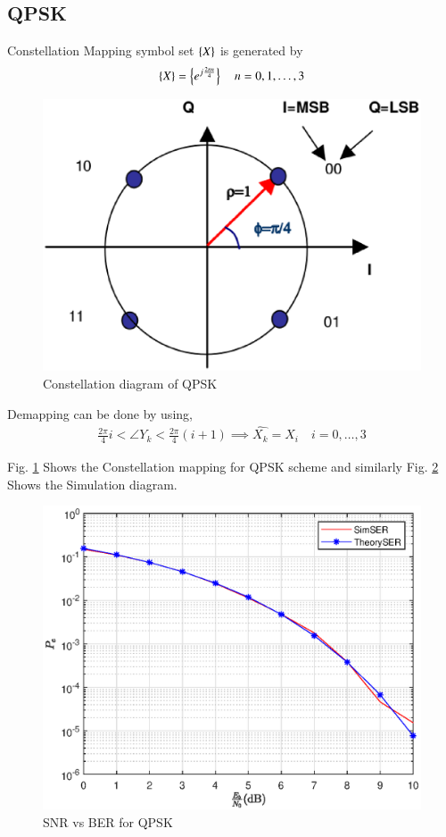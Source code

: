 \documentclass[journal,12pt,twocolumn]{IEEEtran}
\begin{document}
\subsection{QPSK}
Constellation Mapping symbol set $\left\{X\right\}$ is generated by
\begin{equation}
\left\{X\right\}= \left\{e^{j \frac{2\pi n}{4}}\right\} \quad n=0,1,\dots,3
\end{equation}
%
\begin{figure}[!ht]
\begin{center}
\includegraphics[width=\columnwidth]{./figs/qpsk}
\end{center}
\caption{Constellation diagram of QPSK}
\label{fig:qpsk}
\end{figure}
Demapping can be done by using,
\begin{align}
\frac{2\pi }{4}i < \angle{Y_k} < \frac{2\pi }{4}(i+1) \implies \hat{X_k}=X_i \quad i=0,\dots,3
\end{align}

Fig. \ref{fig:qpsk} Shows the Constellation mapping for QPSK scheme and similarly Fig. \ref{fig:qpsk1} Shows the Simulation diagram.
\begin{figure}[!ht]
\begin{center}
\includegraphics[width=\columnwidth]{./figs/QPSK.eps}
\end{center}
\caption{SNR vs BER for QPSK}
\label{fig:qpsk1}
\end{figure}
\end{document}
